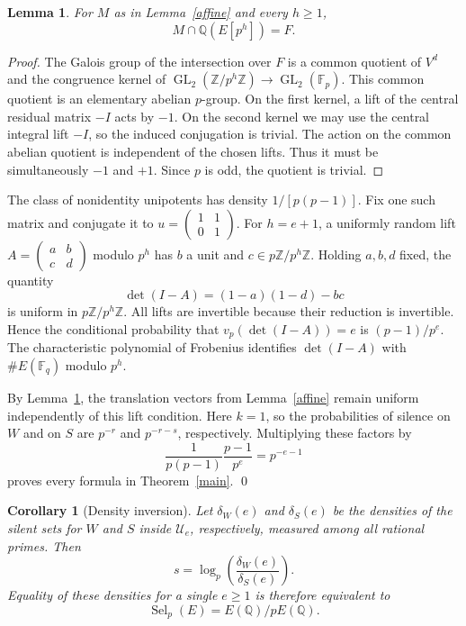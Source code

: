 \documentclass[11pt]{article}
\newtheorem{lemma}[theorem]{Lemma}
\newtheorem{corollary}[theorem]{Corollary}
\theoremstyle{remark}\newtheorem{remark}[theorem]{Remark}
\newcommand{\Q}{\mathbb Q}\newcommand{\F}{\mathbb F}\newcommand{\Z}{\mathbb Z}
\newcommand{\Sel}{\operatorname{Sel}}\newcommand{\Gal}{\operatorname{Gal}}\newcommand{\GL}{\operatorname{GL}}\newcommand{\loc}{\operatorname{loc}}\newcommand{\rk}{\operatorname{rank}}
\begin{document}
\begin{lemma}\label{disjoint}
For $M$ as in Lemma~\ref{affine} and every $h\geq1$,
\[
 M\cap\Q(E[p^h])=F.
\]
\end{lemma}
\begin{proof}
The Galois group of the intersection over $F$ is a common quotient of $V^d$ and the congruence kernel of $\GL_2(\Z/p^h\Z)\to\GL_2(\F_p)$. This common quotient is an elementary abelian $p$-group. On the first kernel, a lift of the central residual matrix $-I$ acts by $-1$. On the second kernel we may use the central integral lift $-I$, so the induced conjugation is trivial. The action on the common abelian quotient is independent of the chosen lifts. Thus it must be simultaneously $-1$ and $+1$. Since $p$ is odd, the quotient is trivial.
\end{proof}

The class of nonidentity unipotents has density $1/[p(p-1)]$. Fix one such matrix and conjugate it to $u=\left(\begin{smallmatrix}1&1\\0&1\end{smallmatrix}\right)$. For $h=e+1$, a uniformly random lift $A=\left(\begin{smallmatrix}a&b\\c&d\end{smallmatrix}\right)$ modulo $p^h$ has $b$ a unit and $c\in p\Z/p^h\Z$. Holding $a,b,d$ fixed, the quantity
\[
 \det(I-A)=(1-a)(1-d)-bc
\]
is uniform in $p\Z/p^h\Z$. All lifts are invertible because their reduction is invertible. Hence the conditional probability that $v_p(\det(I-A))=e$ is $(p-1)/p^e$. The characteristic polynomial of Frobenius identifies $\det(I-A)$ with $\#E(\F_q)$ modulo $p^h$.

By Lemma~\ref{disjoint}, the translation vectors from Lemma~\ref{affine} remain uniform independently of this lift condition. Here $k=1$, so the probabilities of silence on $W$ and on $S$ are $p^{-r}$ and $p^{-r-s}$, respectively. Multiplying these factors by
\[
 \frac{1}{p(p-1)}\frac{p-1}{p^e}=p^{-e-1}
\]
proves every formula in Theorem~\ref{main}. \qed

\begin{corollary}[Density inversion]\label{inverse}
Let $\delta_W(e)$ and $\delta_S(e)$ be the densities of the silent sets for $W$ and $S$ inside $\mathcal U_e$, respectively, measured among all rational primes. Then
\[
 \boxed{s=\log_p\!\left(\frac{\delta_W(e)}{\delta_S(e)}\right).}
\]
Equality of these densities for a single $e\geq1$ is therefore equivalent to
\[\Sel_p(E)=E(\Q)/pE(\Q).\]
\end{corollary}
\end{document}
